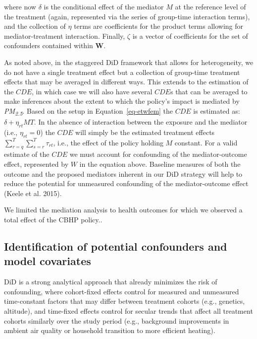 \documentclass[
  letterpaper,
  DIV=11,
  numbers=noendperiod]{scrartcl}
\begin{document}
where now \(\delta\) is the conditional effect of the mediator \(M\) at
the reference level of the treatment (again, represented via the series
of group-time interaction terms), and the collection of \(\eta\) terms
are coefficients for the product terms allowing for mediator-treatment
interaction. Finally, \(\zeta\) is a vector of coefficients for the set
of confounders contained within \(\mathbf{W}\).

As noted above, in the staggered DiD framework that allows for
heterogeneity, we do not have a single treatment effect but a collection
of group-time treatment effects that may be averaged in different ways.
This extends to the estimation of the \(CDE\), in which case we will
also have several \(CDE\)s that can be averaged to make inferences about
the extent to which the policy's impact is mediated by
\emph{PM\textsubscript{2.5}}. Based on the setup in
Equation~\ref{eq-etwfem} the \(CDE\) is estimated as:
\(\delta + \eta_{rt}MT\). In the absence of interaction between the
exposure and the mediator (i.e., \(\eta_{rt}=0\)) the \(CDE\) will
simply be the estimated treatment effects
\(\sum_{r=q}^{T} \sum_{s=r}^{T} \tau_{rt}\), i.e., the effect of the
policy holding \(M\) constant. For a valid estimate of the \(CDE\) we
must account for confounding of the mediator-outcome effect, represented
by \(W\) in the equation above. Baseline measures of both the outcome
and the proposed mediators inherent in our DiD strategy will help to
reduce the potential for unmeasured confounding of the mediator-outcome
effect (Keele et al. 2015).

We limited the mediation analysis to health outcomes for which we
observed a total effect of the CBHP policy..

\hypertarget{identification-of-potential-confounders-and-model-covariates}{%
\subsection{Identification of potential confounders and model
covariates}\label{identification-of-potential-confounders-and-model-covariates}}

DiD is a strong analytical approach that already minimizes the risk of
confounding, where cohort-fixed effects control for measured and
unmeasured time-constant factors that may differ between treatment
cohorts (e.g., genetics, altitude), and time-fixed effects control for
secular trends that affect all treatment cohorts similarly over the
study period (e.g., background improvements in ambient air quality or
household transition to more efficient heating).
\end{document}
